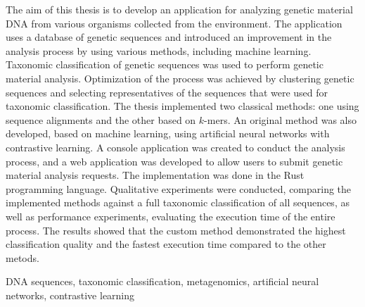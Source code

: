 \cleardoublepage{}

\secondabstract{}
The aim of this thesis is to develop an application for analyzing genetic material DNA from various organisms collected from the environment. The application uses a database of genetic sequences and introduced an improvement in the analysis process by using various methods, including machine learning.
Taxonomic classification of genetic sequences was used to perform genetic material analysis. Optimization of the process was achieved by clustering genetic sequences and selecting representatives of the sequences that were used for taxonomic classification. The thesis implemented two classical methods: one using sequence alignments and the other based on $k$-mers. An original method was also developed, based on machine learning, using artificial neural networks with contrastive learning. A console application was created to conduct the analysis process, and a web application was developed to allow users to submit genetic material analysis requests. The implementation was done in the Rust programming language.
Qualitative experiments were conducted, comparing the implemented methods against a full taxonomic classification of all sequences, as well as performance experiments, evaluating the execution time of the entire process. The results showed that the custom method demonstrated the highest classification quality and the fastest execution time compared to the other metods.


\secondkeywords{}
DNA sequences, taxonomic classification,  metagenomics, artificial neural networks, contrastive learning